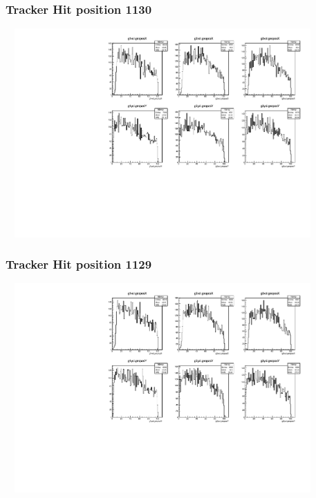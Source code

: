 \documentclass[slidestop,compress,mathserif]{beamer}
\begin{document}
\begin{frame}\frametitle{Tracker Hit position 1130}
	 \includegraphics[width=12cm,height=8cm]{Tracker_Hit_position_1130.pdf}
\end{frame}
\begin{frame}\frametitle{Tracker Hit position 1129}
	 \includegraphics[width=12cm,height=8cm]{Tracker_Hit_position_1129.pdf}
\end{frame}
\end{document}
